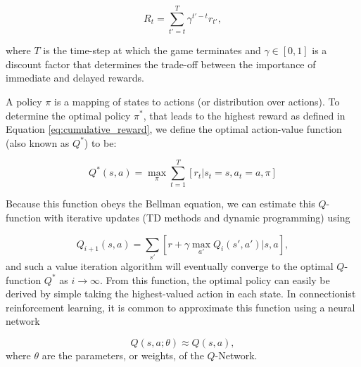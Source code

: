 \begin{equation}\label{eq:cumulative_reward}
	R_t = \sum_{t'=t}^{T} \gamma^{t'-t} r_{t'},
\end{equation}

where $T$ is the time-step at which the game terminates and $\gamma \in [0,1]$ is a discount factor that determines the trade-off between the importance of immediate and delayed rewards. 

A policy $\pi$ is a mapping of states to actions (or distribution over actions). To determine the optimal policy $\pi^*$, that leads to the highest reward as defined in Equation \eqref{eq:cumulative_reward}, we define the optimal action-value function (also known as $Q^*$) to be:

\begin{equation}\label{qfunction}
	Q^*(s, a) = \max_\pi \sum_{t=1}^T [r_t \vert s_t=s, a_t=a, \pi]
\end{equation}

Because this function obeys the Bellman equation, we can estimate this $Q$-function with iterative updates (TD methods and dynamic programming) using

\begin{equation}
	Q_{i+1}(s, a) = \sum_{s'} [r + \gamma \max_{a'} Q_i(s', a') \vert s, a],
\end{equation}
and such a value iteration algorithm will eventually converge to the optimal $Q$-function $Q^*$ as $i \rightarrow \infty$. From this function, the optimal policy can easily be derived by simple taking the highest-valued action in each state. In connectionist reinforcement learning, it is common to approximate this function using a neural network

\begin{equation}
	Q(s, a; \theta) \approx Q(s, a),
\end{equation}
where $\theta$ are the parameters, or weights, of the $Q$-Network.
